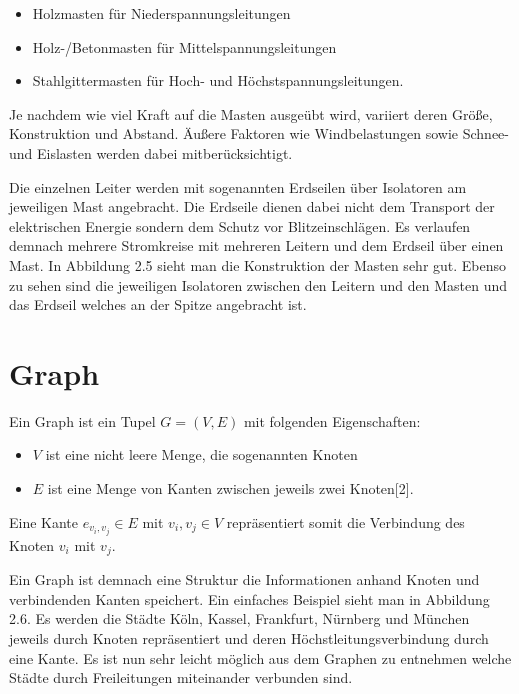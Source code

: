 \begin{itemize}
	\item Holzmasten für Niederspannungsleitungen 
	\item Holz-/Betonmasten für Mittelspannungsleitungen
	\item Stahlgittermasten für Hoch- und Höchstspannungsleitungen.
\end{itemize} 

Je nachdem wie viel Kraft auf die Masten ausgeübt wird, variiert deren Größe, Konstruktion und Abstand. Äußere Faktoren wie Windbelastungen sowie Schnee- und Eislasten werden dabei mitberücksichtigt.

Die einzelnen Leiter werden mit sogenannten Erdseilen über Isolatoren am jeweiligen Mast angebracht. Die Erdseile dienen dabei nicht dem Transport der elektrischen Energie sondern dem Schutz vor Blitzeinschlägen. Es verlaufen demnach mehrere Stromkreise mit mehreren Leitern und dem Erdseil über einen Mast. In Abbildung 2.5 sieht man die Konstruktion der Masten sehr gut. Ebenso zu sehen sind die jeweiligen Isolatoren zwischen den Leitern und den Masten und das Erdseil welches an der Spitze angebracht ist.

\section{Graph}
\label{Graph}
%


Ein Graph ist ein Tupel $G = (V,E)$ mit folgenden Eigenschaften:

\begin{itemize}
	\item $V$ ist eine nicht leere Menge, die sogenannten Knoten
	\item $E$ ist eine Menge von Kanten zwischen jeweils zwei Knoten[2].
\end{itemize} 

Eine Kante $e_{v_{i},v_{j}} \in E$ mit $v_{i},v_{j} \in V$ repräsentiert somit die Verbindung des Knoten $v_{i}$ mit $v_{j}$.

Ein Graph ist demnach eine Struktur die Informationen anhand Knoten und verbindenden Kanten speichert. Ein einfaches Beispiel sieht man in Abbildung 2.6. Es werden die Städte Köln, Kassel, Frankfurt, Nürnberg und München jeweils durch Knoten repräsentiert und deren Höchstleitungsverbindung durch eine Kante. Es ist nun sehr leicht möglich aus dem Graphen zu entnehmen welche Städte durch Freileitungen miteinander verbunden sind.\\

